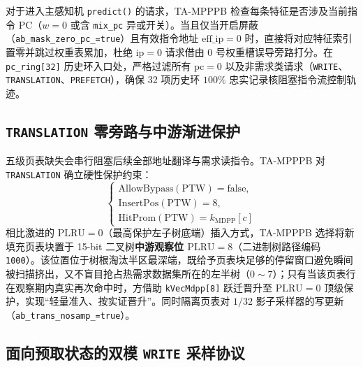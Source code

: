 \documentclass[10.5pt,compsoc,UTF8]{CjC}
\begin{document}
对于进入主感知机 \texttt{predict()} 的请求，TA-MPPPB 检查每条特征是否涉及当前指令 PC（$w=0$ 或含 \texttt{mix\_pc} 异或开关）。当且仅当开启屏蔽（\texttt{ab\_mask\_zero\_pc\_=true}）且有效指令地址 $\mathrm{eff\_ip}=0$ 时，直接将对应特征索引置零并跳过权重表累加，杜绝 $\mathrm{ip}=0$ 请求借由 0 号权重槽误导旁路打分。在 \texttt{pc\_ring[32]} 历史环入口处，严格过滤所有 $\mathrm{pc}=0$ 以及非需求类请求（\texttt{WRITE}、\texttt{TRANSLATION}、\texttt{PREFETCH}），确保 32 项历史环 $100\%$ 忠实记录核阻塞指令流控制轨迹。

\subsection{\texorpdfstring{\texttt{TRANSLATION}}{TRANSLATION} 零旁路与中游渐进保护}

五级页表缺失会串行阻塞后续全部地址翻译与需求读指令。TA-MPPPB 对 \texttt{TRANSLATION} 确立硬性保护约束：
\begin{equation}
\begin{cases}
\mathrm{AllowBypass}(\mathrm{PTW}) = \mathrm{false}, \\
\mathrm{InsertPos}(\mathrm{PTW}) = 8, \\
\mathrm{HitProm}(\mathrm{PTW}) = k_{\mathrm{MDPP}}[c]
\end{cases}
\end{equation}
相比激进的 $\mathrm{PLRU}=0$（最高保护左子树底端）插入方式，TA-MPPPB 选择将新填充页表块置于 15-bit 二叉树\textbf{中游观察位 $\mathrm{PLRU}=8$}（二进制树路径编码 \texttt{1000}）。该位置位于树根淘汰半区最深端，既给予页表块足够的停留窗口避免瞬间被扫描挤出，又不盲目抢占热需求数据集所在的左半树（$0\sim 7$）；只有当该页表行在观察期内真实再次命中时，方借助 \texttt{kVecMdpp[8]} 跃迁晋升至 $\mathrm{PLRU}=0$ 顶级保护，实现“轻量准入、按实证晋升”。同时隔离页表对 $1/32$ 影子采样器的写更新（\texttt{ab\_trans\_nosamp\_=true}）。

\subsection{\texorpdfstring{面向预取状态的双模 \texttt{WRITE} 采样协议}{面向预取状态的双模 WRITE 采样协议}}
\end{document}
